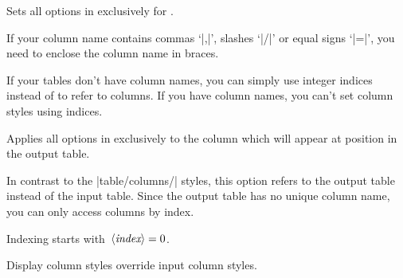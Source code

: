\begin{pgfplotstablecolumnkey}
    Sets all options in  exclusively for .
\begin{codeexample}[pre={\begin{lateximage}},post={\end{lateximage}}]
\end{codeexample}
    If your column name contains commas `|,|', slashes `|/|' or equal signs
    `|=|', you need to enclose the column name in braces.
\begin{codeexample}[pre={\begin{lateximage}},post={\end{lateximage}},narrow]
\end{codeexample}
    If your tables don't have column names, you can simply use integer indices
    instead of  to refer to columns. If you have column
    names, you can't set column styles using indices.
\end{pgfplotstablecolumnkey}

\begin{pgfplotstabledisplaycolumnkey}
    Applies all options in  exclusively to the column
    which will appear at position  in the output table.

    In contrast to the |table/columns/| styles, this option refers
    to the output table instead of the input table. Since the output table has
    no unique column name, you can only access columns by index.

    Indexing starts with~$\langle\textit{index}\rangle=0$.

    Display column styles override input column styles.
\end{pgfplotstabledisplaycolumnkey}

